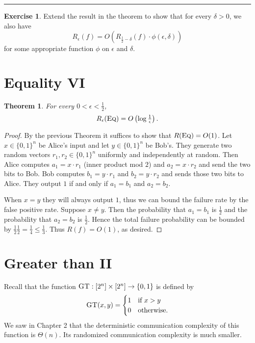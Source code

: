 \documentclass[11pt]{amsart}
\theoremstyle{plain}
\newtheorem{theorem}{Theorem}
\theoremstyle{definition}
\newtheorem{exercise}{Exercise}
\theoremstyle{plain}
\newcommand{\Eq}{\textsc{Eq}}
\newcommand{\GT}{\textsc{GT}}
\newcommand{\exercises}{\bigskip \noindent\rule{8cm}{0.4pt} \medskip}
\begin{document}
\exercises

\begin{exercise}
Extend the result in the theorem to show that for every $\delta > 0$, we also have
\[
R_\epsilon(f) = O\left( R_{\frac12 - \delta}(f) \cdot \phi(\epsilon,\delta) \right)
\]
for some appropriate function $\phi$ on $\epsilon$ and $\delta$.
\end{exercise}


\newpage 
\section{Equality VI}


\begin{theorem}
For every $0 < \epsilon < \frac12$,
\[
R_\epsilon(\Eq) = O\left(\log \tfrac1\epsilon \right).
\]
\end{theorem}

\begin{proof}
By the previous Theorem it suffices to show that $R(\Eq) = O(1)$. Let $x \in \{0,1\}^n$ be Alice's input and let $y \in \{0,1\}^n$ be Bob's. They generate two random vectors $r_1, r_2  \in \{0,1\}^n$ uniformly and independently at random. Then Alice computes $a_1 = x\cdot r_1$ (inner product mod $2$) and $a_2 = x\cdot r_2$ and send the two bits to Bob. Bob computes $b_1 = y\cdot r_1$ and $b_2 = y \cdot r_2$ and sends those two bits to Alice. They output $1$ if and only if $a_1 = b_1$ and $a_2 = b_2$.

When $x = y$ they will always output $1$, thus we can bound the failure rate by the false positive rate. Suppose $x \neq y$. Then the probability that $a_1 = b_1$ is $\frac{1}{2}$ and the probability that $a_2 = b_2$ is $\frac{1}{2}$. Hence the total failure probability can be bounded by  $\frac{1}{2}\frac{1}{2} = \frac{1}{4} \leq \frac{1}{3}$. Thus $R(f) = O(1)$, as desired.
\end{proof}


\newpage 
\section{Greater than II}

Recall that the function $\GT : [2^n] \times [2^n] \to \{0,1\}$ is defined by
\[
\GT(x,y) = \begin{cases}
1 & \mbox{if } x > y \\
0 & \mbox{otherwise.}
\end{cases}
\]
We saw in Chapter 2 that the deterministic communication complexity of this function is $\Theta(n)$. Its randomized communication complexity is much smaller.
\end{document}
